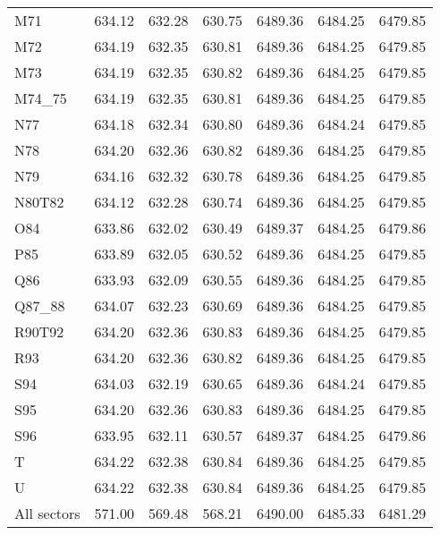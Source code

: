 \begin{tabular}{lllllll}
M71 & 634.12 & 632.28 & 630.75 & 6489.36 & 6484.25 & 6479.85 \\
M72 & 634.19 & 632.35 & 630.81 & 6489.36 & 6484.25 & 6479.85 \\
M73 & 634.19 & 632.35 & 630.82 & 6489.36 & 6484.25 & 6479.85 \\
M74\_75 & 634.19 & 632.35 & 630.81 & 6489.36 & 6484.25 & 6479.85 \\
N77 & 634.18 & 632.34 & 630.80 & 6489.36 & 6484.24 & 6479.85 \\
N78 & 634.20 & 632.36 & 630.82 & 6489.36 & 6484.25 & 6479.85 \\
N79 & 634.16 & 632.32 & 630.78 & 6489.36 & 6484.25 & 6479.85 \\
N80T82 & 634.12 & 632.28 & 630.74 & 6489.36 & 6484.25 & 6479.85 \\
O84 & 633.86 & 632.02 & 630.49 & 6489.37 & 6484.25 & 6479.86 \\
P85 & 633.89 & 632.05 & 630.52 & 6489.36 & 6484.25 & 6479.85 \\
Q86 & 633.93 & 632.09 & 630.55 & 6489.36 & 6484.25 & 6479.85 \\
Q87\_88 & 634.07 & 632.23 & 630.69 & 6489.36 & 6484.25 & 6479.85 \\
R90T92 & 634.20 & 632.36 & 630.83 & 6489.36 & 6484.25 & 6479.85 \\
R93 & 634.20 & 632.36 & 630.82 & 6489.36 & 6484.25 & 6479.85 \\
S94 & 634.03 & 632.19 & 630.65 & 6489.36 & 6484.24 & 6479.85 \\
S95 & 634.20 & 632.36 & 630.83 & 6489.36 & 6484.25 & 6479.85 \\
S96 & 633.95 & 632.11 & 630.57 & 6489.37 & 6484.25 & 6479.86 \\
T & 634.22 & 632.38 & 630.84 & 6489.36 & 6484.25 & 6479.85 \\
U & 634.22 & 632.38 & 630.84 & 6489.36 & 6484.25 & 6479.85 \\
All sectors & 571.00 & 569.48 & 568.21 & 6490.00 & 6485.33 & 6481.29 \\
\bottomrule
\end{tabular}
